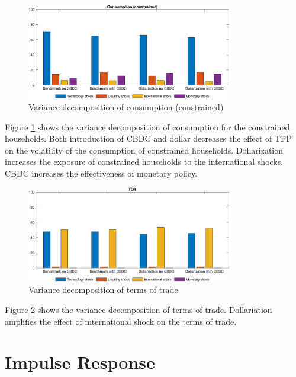 \documentclass[12pt]{article}
\begin{document}
\begin{figure}[h!]
\centering
\includegraphics[width=0.8\textwidth]{log_c2}
\caption{Variance decomposition of consumption (constrained)}
\label{log_c2}
\end{figure}

Figure \ref{log_c2} shows the variance decomposition of consumption for the constrained households. Both introduction of CBDC and dollar decreases the effect of TFP on the volatility of the consumption of constrained households. Dollarization increases the exposure of constrained households to the international shocks. CBDC increases the effectiveness of monetary policy. 

\begin{figure}[h!]
\centering
\includegraphics[width=0.8\textwidth]{log_tot}
\caption{Variance decomposition of terms of trade}
\label{log_tot}
\end{figure}

Figure \ref{log_tot} shows the variance decomposition of terms of trade. Dollariation amplifies the effect of international shock on the terms of trade.

\clearpage
\section{Impulse Response}
\end{document}
